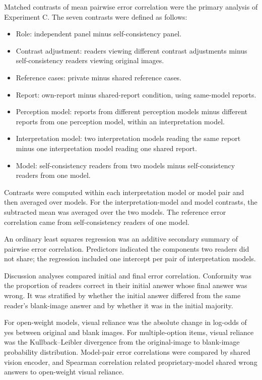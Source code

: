 Matched contrasts of mean pairwise error correlation were the primary analysis of Experiment C.
The seven contrasts were defined as follows:
\begin{itemize}
\item Role: independent panel minus self-consistency panel.
\item Contrast adjustment: readers viewing different contrast adjustments minus self-consistency readers viewing original images.
\item Reference cases: private minus shared reference cases.
\item Report: own-report minus shared-report condition, using same-model reports.
\item Perception model: reports from different perception models minus different reports from one perception model, within an interpretation model.
\item Interpretation model: two interpretation models reading the same report minus one interpretation model reading one shared report.
\item Model: self-consistency readers from two models minus self-consistency readers from one model.
\end{itemize}
Contrasts were computed within each interpretation model or model pair and then averaged over models.
For the interpretation-model and model contrasts, the subtracted mean was averaged over the two models.
The reference error correlation came from self-consistency readers of one model.

An ordinary least squares regression was an additive secondary summary of pairwise error correlation.
Predictors indicated the components two readers did not share; the regression included one intercept per pair of interpretation models.

Discussion analyses compared initial and final error correlation.
Conformity was the proportion of readers correct in their initial answer whose final answer was wrong.\cite{asch1956conformity,demystifying_mad}
It was stratified by whether the initial answer differed from the same reader's blank-image answer and by whether it was in the initial majority.

For open-weight models, visual reliance was the absolute change in log-odds of yes between original and blank images.
For multiple-option items, visual reliance was the Kullback--Leibler divergence from the original-image to blank-image probability distribution.
Model-pair error correlations were compared by shared vision encoder, and Spearman correlation related proprietary-model shared wrong answers to open-weight visual reliance.

